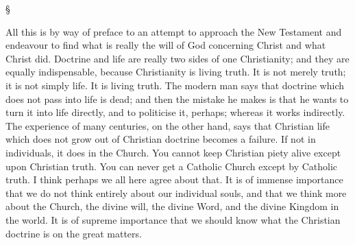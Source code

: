 \documentclass[12pt,letterpaper,oneside]{book}
\begin{document}
\begin{center}
\S
\end{center}

All this is by way of preface to an attempt to 
approach the New Testament and endeavour to 
find what is really the will of God concerning 
Christ and what Christ did. Doctrine and life 
are really two sides of one Christianity; and 
they are equally indispensable, because Christianity 
is living truth. It is not merely 
truth; it is not simply life. It is living 
truth. The modern man says that doctrine 
which does not pass into life is dead; 
and then the mistake he makes is that he 
wants to turn it into life directly, and to 
politicise it, perhaps; whereas it works indirectly.
The experience of many centuries, 
on the other hand, says that Christian life 
which does not grow out of Christian doctrine 
becomes a failure. If not in individuals, it 
does in the Church. You cannot keep Christian 
piety alive except upon Christian truth. You 
can never get a Catholic Church except by 
Catholic truth. I think perhaps we all here 
agree about that. It is of immense importance 
that we do not think entirely about our individual 
souls, and that we think more about 
the Church, the divine will, the divine Word, 
and the divine Kingdom in the world. It is 
of supreme importance that we should know 
what the Christian doctrine is on the great 
matters. 
\end{document}
